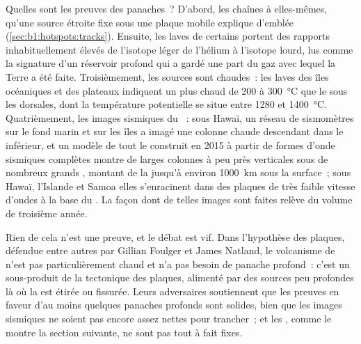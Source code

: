 Quelles sont les preuves des panaches~? D'abord, les chaînes à  elles-mêmes,
qu'une source étroite fixe sous une plaque mobile explique d'emblée
(\cref{sec:b1:hotspots:tracks}). Ensuite, les laves de certains  portent des
rapports inhabituellement élevés de l'isotope léger de l'hélium à l'isotope lourd, lus comme la
signature d'un réservoir profond qui a gardé une part du gaz avec lequel la Terre a été faite.
Troisièmement, les sources sont chaudes~: les laves des îles océaniques et des plateaux indiquent
un  plus chaud de 200 à \qty{300}{\celsius} que le  sous les dorsales,
dont la température potentielle se situe entre 1280 et \qty{1400}{\celsius}. Quatrièmement,
les images sismiques du ~: sous Hawaï, un réseau de sismomètres sur le
fond marin et sur les îles a imagé une colonne chaude descendant dans le 
inférieur, et un modèle de tout le  construit en 2015 à partir de formes d'onde
sismiques complètes montre de larges colonnes à peu près verticales sous de nombreux grands
, montant de la  jusqu'à environ \qty{1000}{km} sous
la surface~; sous Hawaï, l'Islande et Samoa elles s'enracinent dans des plaques de
très faible vitesse d'ondes à la base du . La façon dont de telles images sont faites relève
du volume de troisième année.

Rien de cela n'est une preuve, et le débat est vif. Dans l'hypothèse des plaques,
défendue entre autres par Gillian Foulger et James Natland, le volcanisme de 
n'est pas particulièrement chaud et n'a pas besoin de panache profond~: c'est un sous-produit de la tectonique
des plaques, alimenté par des sources peu profondes là où la  est étirée ou
fissurée. Leurs adversaires soutiennent que les preuves en faveur d'au moins quelques panaches profonds
sont solides, bien que les images sismiques ne soient pas encore assez nettes pour trancher~; et
les , comme le montre la section suivante, ne sont pas tout à fait fixes.

